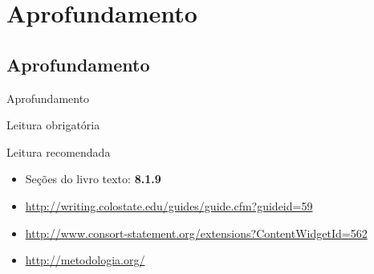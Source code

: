 \documentclass{beamer}
\begin{document}
\section{Aprofundamento}

\subsection{Aprofundamento}

\begin{frame}{Aprofundamento}
  \begin{block}{Leitura obrigatória}
  \end{block}
  \begin{block}{Leitura recomendada}
    \begin{itemize}
      \scriptsize
    \item Seções do livro texto: {\bf 8.1.9}
      \tiny
    \item \url{http://writing.colostate.edu/guides/guide.cfm?guideid=59}
    \item \url{http://www.consort-statement.org/extensions?ContentWidgetId=562}
    \item \url{http://metodologia.org/}
    \end{itemize}
  \end{block}
\end{frame}
\end{document}
